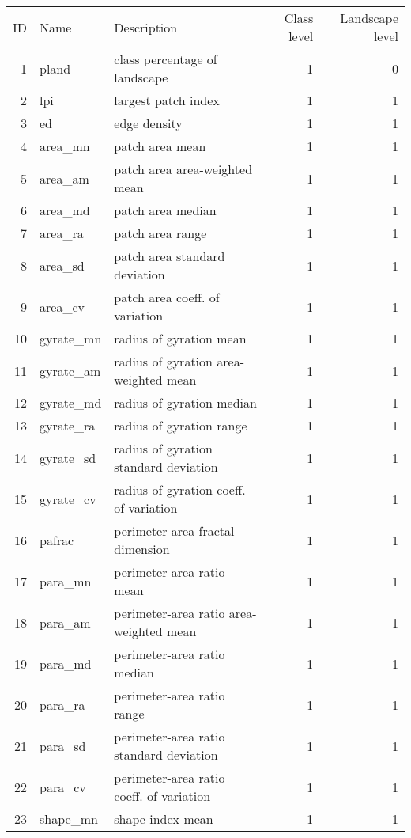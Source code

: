 \begin{longtable}{rllrr}
  \hline
ID & Name & Description & Class level & Landscape level \\ 
   1 & pland & class percentage of landscape &   1 &   0 \\ 
    2 & lpi & largest patch index &   1 &   1 \\ 
    3 & ed & edge density &   1 &   1 \\ 
    4 & area\_mn & patch area mean &   1 &   1 \\ 
    5 & area\_am & patch area area-weighted mean &   1 &   1 \\ 
    6 & area\_md & patch area median &   1 &   1 \\ 
    7 & area\_ra & patch area range &   1 &   1 \\ 
    8 & area\_sd & patch area standard deviation &   1 &   1 \\ 
    9 & area\_cv & patch area coeff. of variation &   1 &   1 \\ 
   10 & gyrate\_mn & radius of gyration mean &   1 &   1 \\ 
   11 & gyrate\_am & radius of gyration area-weighted mean &   1 &   1 \\ 
   12 & gyrate\_md & radius of gyration median &   1 &   1 \\ 
   13 & gyrate\_ra & radius of gyration range &   1 &   1 \\ 
   14 & gyrate\_sd & radius of gyration standard deviation &   1 &   1 \\ 
   15 & gyrate\_cv & radius of gyration coeff. of variation &   1 &   1 \\ 
   16 & pafrac & perimeter-area fractal dimension &   1 &   1 \\ 
   17 & para\_mn & perimeter-area ratio mean &   1 &   1 \\ 
   18 & para\_am & perimeter-area ratio area-weighted mean &   1 &   1 \\ 
   19 & para\_md & perimeter-area ratio median &   1 &   1 \\ 
   20 & para\_ra & perimeter-area ratio range &   1 &   1 \\ 
   21 & para\_sd & perimeter-area ratio standard deviation &   1 &   1 \\ 
   22 & para\_cv & perimeter-area ratio coeff. of variation &   1 &   1 \\ 
   23 & shape\_mn & shape index mean &   1 &   1 \\ 

\end{longtable}
